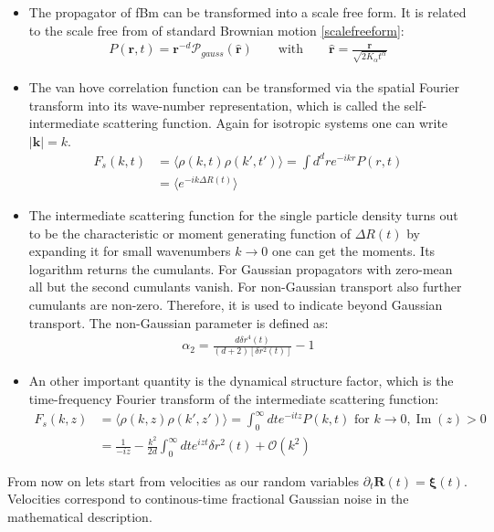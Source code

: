 \documentclass[
  a4paper,BCOR10mm,oneside,
  bibtotoc,idxtotoc,
  headsepline,footsepline,%
  fleqn,openbib
]{scrbook}
\begin{document}
\begin{itemize}
\item The propagator of fBm can be transformed into a scale free form. It is related to the scale free from of standard Brownian motion \cref{scalefreeform}:
\begin{align}
P(\bm{r},t)= \bm{r}^{-d} \mathcal{P}_{gauss}(\hat{\bm{r}})  \qquad \text{with} \qquad \hat{\bm{r}} = \frac{\bm{r}}{\sqrt{2 K_{\alpha} t^{\alpha}}} \label{scalefreeformfrac}
\end{align}
\item The van hove correlation function can be transformed via the spatial Fourier transform into its wave-number representation, which is called the self-intermediate scattering function. Again for isotropic systems one can write $|\bm{k}|=k$.
\begin{align}
 F_{s}(k,t)&=\langle\rho(k,t) \rho(k',t')\rangle=\int d^{d}r e^{-i k r} P(r,t) \\
 &=\langle e^{-i k \Delta R(t)} \rangle
\end{align}
\item 
The intermediate scattering function for the single particle density turns out to be the characteristic or moment generating function of $\Delta R(t)$ by expanding it for small wavenumbers $k \rightarrow 0$ one can get the moments. Its logarithm returns the cumulants. For Gaussian propagators with zero-mean all but the second cumulants vanish. For non-Gaussian transport also further cumulants are non-zero. Therefore, it is used to indicate beyond Gaussian transport. The non-Gaussian parameter is defined as:
\begin{align}
 \alpha_2=\frac{d \delta r^{4}(t)}{(d+2) [\delta r^{2}(t)]}-1 \label{nongaussian2}
\end{align}
\item
An other important quantity is the dynamical structure factor, which is the time-frequency Fourier transform of the intermediate scattering function:
\begin{align}
 F_{s}(k,z)&=\langle\rho(k,z) \rho(k',z')\rangle=\int_{0}^{\infty} d t e^{-i t z} P(k,t) \text{ for } k \rightarrow 0 , \operatorname{Im}(z) > 0 \label{dynamicstructurfactor}\\
 &= \frac{1}{-iz}-\frac{k^2}{2d}\int_{0}^{\infty} d t e^{izt} \delta r^2 (t) + \mathcal{O}(k^2)
\end{align}

\end{itemize}
From now on lets start from velocities as our random variables $\partial_t \bm{R}(t)=\bm{\xi}(t)$. Velocities correspond to continous-time fractional Gaussian noise in the mathematical description.
\end{document}
